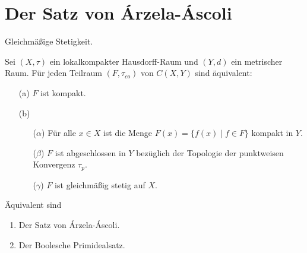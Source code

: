 \chapter{Der Satz von Árzela-Áscoli}

\begin{defn}
  Gleichmäßige Stetigkeit.
\end{defn}

\begin{defn}
  Sei $(X,\tau)$ ein lokalkompakter Hausdorff-Raum und $(Y,d)$ ein metrischer Raum.
  Für jeden Teilraum $(F,\tau_{co})$ von $C(X,Y)$ sind äquivalent:
  \begin{enumerate}
    \item[(a)] $F$ ist kompakt.
    \item[(b)] \begin{enumerate}
        \item[($\alpha$)] Für alle $x \in X$ ist die Menge $F(x) = \{f(x) \mid f \in F \}$ kompakt in $Y$.
        \item[($\beta$)]  $F$ ist abgeschlossen in $Y$ bezüglich der Topologie der punktweisen Konvergenz $\tau_p$.
        \item[($\gamma$)] $F$ ist gleichmäßig stetig auf $X$.
      \end{enumerate}
  \end{enumerate}
\end{defn}

\begin{thm}
  Äquivalent sind
  \begin{enumerate}
    \item Der Satz von Árzela-Áscoli.
    \item Der Boolesche Primidealsatz.
  \end{enumerate}
\end{thm}

